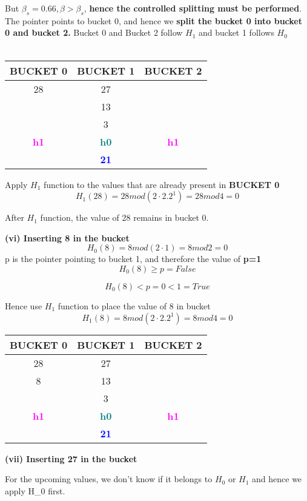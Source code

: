But $\beta_s = 0.66 , \beta>\beta_s$,\textbf{ hence the controlled splitting must be performed}. The pointer points to bucket 0, and hence we \textbf{split the bucket 0 into bucket 0 and bucket 2.} Bucket 0 and Bucket 2 follow $H_1$ and bucket 1 follows $H_0$
\\
\\
\begin{tabular}{ |c|c|c| } 
 \hline
 BUCKET 0 & \textbf{\color{red}{P}} BUCKET 1 & BUCKET 2\\ [0.5ex] 
 \hline\hline
 \hline
  28 & 27 & \\ 
   & 13 & \\
   & 3 & \\
 \hline
 \hline
\textbf{\textcolor{magenta}{h1}} & \textbf{\textcolor{teal}{h0}}& \textbf{\textcolor{magenta}{h1}}\\ [0.5ex] 
 \hline
     & \textbf{\textcolor{blue}{21}}
\end{tabular}

\newpage

Apply $H_1$ function to the values that are already present in \textbf{BUCKET 0}
\[H_1(28) = 28 mod (2 \cdot 2.2^1)  = 28 mod 4 = 0\]

After $H_1$ function, the value of 28 remains in bucket 0.


\textbf{(vi) Inserting 8 in the bucket}
\[H_0(8) = 8 mod (2 \cdot 1)  = 8 mod 2 = 0\]
    p is the pointer pointing to bucket 1, and therefore the value of \textbf{p=1}
\[H_0(8)\ge p = False\]

\[H_0(8) < p = 0 < 1 = True\]

Hence use $H_1$ function to place the value of 8 in bucket
\[H_1(8) = 8 mod (2 \cdot 2.2^1)  = 8 mod 4 = 0\]



\begin{tabular}{ |c|c|c| } 
 \hline
 BUCKET 0 & \textbf{\color{red}{P}} BUCKET 1 & BUCKET 2\\ [0.5ex] 
 \hline\hline
 \hline
  28 & 27 & \\ 
   8 & 13 & \\
   & 3 & \\
 \hline
 \hline
\textbf{\textcolor{magenta}{h1}} & \textbf{\textcolor{teal}{h0}}& \textbf{\textcolor{magenta}{h1}}\\ [0.5ex] 
 \hline
     & \textbf{\textcolor{blue}{21}}
\end{tabular}

\textbf{(vii) Inserting 27 in the bucket}

For the upcoming values, we don't know if it belongs to $H_0$ or $H_1$ and hence we apply {H_0} first.


